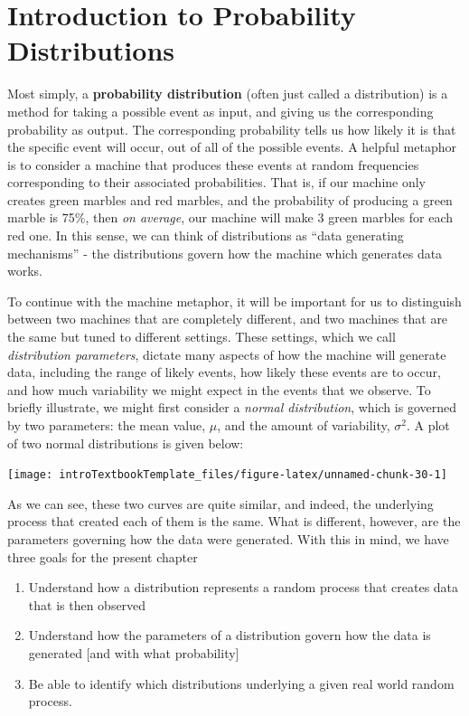\documentclass[
]{book}
\providecommand{\tightlist}{%
  \setlength{\itemsep}{0pt}\setlength{\parskip}{0pt}}
\theoremstyle{definition}
\theoremstyle{definition}
\theoremstyle{definition}
\theoremstyle{remark}
\begin{document}
\hypertarget{introduction-to-probability-distributions}{%
\section{Introduction to Probability Distributions}\label{introduction-to-probability-distributions}}

Most simply, a \textbf{probability distribution} (often just called a distribution) is a method for taking a possible event as input, and giving us the corresponding probability as output. The corresponding probability tells us how likely it is that the specific event will occur, out of all of the possible events. A helpful metaphor is to consider a machine that produces these events at random frequencies corresponding to their associated probabilities. That is, if our machine only creates green marbles and red marbles, and the probability of producing a green marble is 75\%, then \emph{on average}, our machine will make 3 green marbles for each red one. In this sense, we can think of distributions as ``data generating mechanisms'' - the distributions govern how the machine which generates data works.

To continue with the machine metaphor, it will be important for us to distinguish between two machines that are completely different, and two machines that are the same but tuned to different settings. These settings, which we call \emph{distribution parameters}, dictate many aspects of how the machine will generate data, including the range of likely events, how likely these events are to occur, and how much variability we might expect in the events that we observe. To briefly illustrate, we might first consider a \emph{normal distribution}, which is governed by two parameters: the mean value, \(\mu\), and the amount of variability, \(\sigma^2\). A plot of two normal distributions is given below:

\begin{center}\texttt{[image: introTextbookTemplate\_files/figure-latex/unnamed-chunk-30-1]} \end{center}

As we can see, these two curves are quite similar, and indeed, the underlying process that created each of them is the same. What is different, however, are the parameters governing how the data were generated. With this in mind, we have three goals for the present chapter

\begin{enumerate}
\def\labelenumi{\arabic{enumi}.}
\tightlist
\item
  Understand how a distribution represents a random process that creates data that is then observed
\item
  Understand how the parameters of a distribution govern how the data is generated {[}and with what probability{]}
\item
  Be able to identify which distributions underlying a given real world random process.
\end{enumerate}
\end{document}
